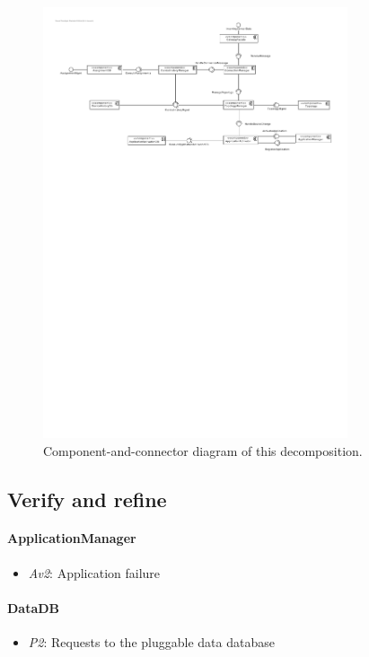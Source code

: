 \documentclass[english]{sareport}
\begin{document}
\begin{figure}[!htp]
	\centering
	\includegraphics[width=0.8\textwidth]{component_diagram_2.pdf}
	\caption{Component-and-connector diagram of this decomposition.
	}\label{fig:it2-cc_main}
\end{figure}

\subsection{Verify and refine}

\paragraph{ApplicationManager}
\begin{itemize}
	\item \emph{Av2}: Application failure
\end{itemize}

\paragraph{DataDB}
\begin{itemize}
	\item \emph{P2}: Requests to the pluggable data database
\end{itemize}
\end{document}
